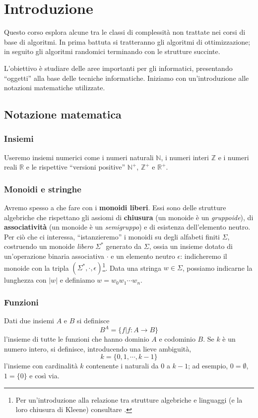 
\chapter{Introduzione}
Questo corso esplora alcune tra le classi di complessità non trattate nei corsi di base di algoritmi.
In prima battuta si tratteranno gli algoritmi di ottimizzazione; in seguito gli algoritmi randomici
terminando con le strutture succinte.

L'obiettivo è studiare delle aree importanti per gli informatici, presentando ``oggetti'' alla base delle
tecniche informatiche. Iniziamo con un'introduzione alle notazioni matematiche utilizzate.

\section{Notazione matematica}
\subsection{Insiemi}
Useremo insiemi numerici come i numeri naturali $\mathbb{N}$,
i numeri interi $\mathbb{Z}$ e i numeri reali $\mathbb{R}$ e le rispettive
``versioni positive'' $\mathbb{N}^+$,  $\mathbb{Z}^+$ e $\mathbb{R}^+$.

\subsection{Monoidi e stringhe}
Avremo spesso a che fare con i {\bf monoidi liberi}. Essi sono delle strutture
algebriche che rispettano gli assiomi di {\bf chiusura} (un monoide è un \textit{gruppoide}),
di {\bf associatività} (un monoide è un \textit{semigruppo}) e di esistenza dell'elemento neutro.
Per ciò che ci interessa, ``istanzieremo'' i monoidi su degli alfabeti finiti $\Sigma$, costruendo
un monoide \textit{libero}\textit{} $\Sigma^*$ generato da $\Sigma$, ossia un insieme dotato
di un'operazione binaria associativa $\cdot$ e un elemento neutro $\epsilon$:
indicheremo il monoide con la tripla $(\Sigma^*, \cdot, \epsilon)$\footnote{
	Per un'introduzione alla relazione tra strutture algebriche e linguaggi (e la loro
	chiusura di Kleene) consultare \cite{sakarovitch_2009}.}.
Data una stringa $w \in \Sigma$, possiamo indicarne la lunghezza con
$|w|$ e definiamo $w = w_0 w_1\cdots w_n$.

\subsection{Funzioni}
Dati due insiemi $A$ e $B$ si definisce
$$
	B^A = \{f | f: A \rightarrow B\}
$$
l'insieme di tutte le funzioni che hanno dominio $A$ e codominio $B$.
Se $k$ è un numero intero, si definisce, introducendo una lieve ambiguità,
$$
	k = \{0,1,\cdots,k-1\}
$$
l'insieme con cardinalità $k$ contenente i naturali da $0$ a $k-1$;
ad esempio, $0 = \emptyset$, $1 = \{0\}$ e così via.

